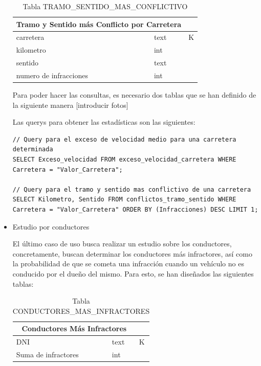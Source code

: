 \documentclass[]{article}
\begin{document}
\begin{itemize}
    \begin{table}[H]
        \centering
        \begin{tabular}{lll} 
            \toprule
            \multicolumn{2}{c}{\large\textbf{Tramo y Sentido más Conflicto por Carretera}} \\ 
            \midrule
            carretera     & text & K\\
            kilometro     & int & \\
            sentido       & text& \\
            numero de infracciones & int & \\
            \bottomrule
        \end{tabular}
        \caption {Tabla TRAMO\_SENTIDO\_MAS\_CONFLICTIVO}
    \end{table}
    

    Para poder hacer las consultas, es necesario dos tablas que se han definido de la siguiente manera [introducir fotos]

    Las querys para obtener las estadísticas son las siguientes:

    \begin{lstlisting}[language=cql, caption=Querys para el caso de uso 2]
// Query para el exceso de velocidad medio para una carretera determinada
SELECT Exceso_velocidad FROM exceso_velocidad_carretera WHERE Carretera = "Valor_Carretera";

// Query para el tramo y sentido mas conflictivo de una carretera
SELECT Kilometro, Sentido FROM conflictos_tramo_sentido WHERE Carretera = "Valor_Carretera" ORDER BY (Infracciones) DESC LIMIT 1;
    \end{lstlisting}
 
    \item Estudio por conductores

    El último caso de uso busca realizar un estudio sobre los conductores, concretamente, buscan determinar los conductores más infractores, así como la probabilidad de que se cometa una infracción cuando un vehículo no es conducido por el dueño del mismo. Para esto, se han diseñados las siguientes tablas: 

    \begin{table}[H]
        \centering
        \begin{tabular}{lll} 
            \toprule
            \multicolumn{2}{c}{\large\textbf{Conductores Más Infractores}} \\ 
            \midrule
            DNI       & text & K\\
            Suma de infractores     & int & \\
            \bottomrule
        \end{tabular}
        \caption {Tabla CONDUCTORES\_MAS\_INFRACTORES}
     \end{table}


\end{itemize}
\end{document}
